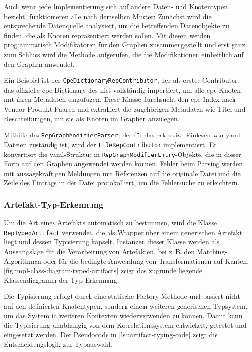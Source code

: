 Auch wenn jede Implementierung sich auf andere Daten- und Knotentypen bezieht, funktionieren alle nach demselben Muster:
Zunächst wird die entsprechende Datenquelle analysiert, um die betreffenden Datenobjekte zu finden, die als Knoten repräsentiert werden sollen.
Mit diesen werden programmatisch Modifikatoren für den Graphen zusammengestellt und erst ganz zum Schluss wird die Methode aufgerufen, die die Modifikationen einheitlich auf den Graphen anwendet.

Ein Beispiel ist der \texttt{CpeDictionaryRepContributor}, der als erster Contributor das offizielle \acrshort{cpe}-Dictionary des \acrshort{nist} vollständig importiert, um alle \acrshort{cpe}-Knoten mit ihren Metadaten einzufügen.
Diese Klasse durchsucht den \acrshort{cpe}-Index nach Vendor-Produkt-Paaren und extrahiert die zugehörigen Metadaten wie Titel und Beschreibungen, um sie als Knoten im Graphen anzulegen.

Mithilfe des \texttt{RepGraphModifierParser}, der für das rekursive Einlesen von \acrshort{yaml}-Dateien zuständig ist, wird der \texttt{FileRepContributor} implementiert.
Er konvertiert die \acrshort{yaml}-Struktur in \texttt{RepGraphModifierEntry}-Objekte, die in dieser Form auf den Graphen angewendet werden können.
Fehler beim Parsing werden mit aussagekräftigen Meldungen mit Referenzen auf die originale Datei und die Zeile des Eintrags in der Datei protokolliert, um die Fehlersuche zu erleichtern.

\subsubsection{Artefakt-Typ-Erkennung}\label{subsubsec:impl-artifact-type-detection}

Um die Art eines Artefakts automatisch zu bestimmen, wird die Klasse \texttt{RepTypedArtifact} verwendet, die als Wrapper über einem generischen Artefakt liegt und dessen Typisierung kapselt.
Instanzen dieser Klasse werden als Ausgangslage für die Verarbeitung von Artefakten, bei z.\,B. den Matching-Algorithmen oder für die bedingte Anwendung von Transformationen auf Kanten.
\autoref{fig:impl-class-diagram-typed-artifacts} zeigt das zugrunde liegende Klassendiagramm der Typ-Erkennung.

Die Typisierung erfolgt durch eine statische Factory-Methode und basiert nicht auf den definierten Knotentypen, sondern einem weiteren generischen Typsystem, um das System in weiteren Kontexten wiederverwenden zu können.
Damit kann die Typisierung unabhängig von dem Korrelationssystem entwickelt, getestet und eingesetzt werden.
Der Pseudocode in \autoref{lst:artifact-typing-code} zeigt die Entscheidungslogik zur Typauswahl.

